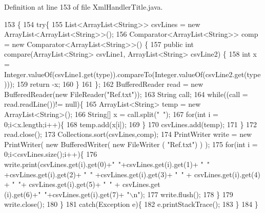 Definition at line 153 of file Xml\-Handler\-Title.\-java.


\begin{DoxyCode}
153                       \{
154         \textcolor{keywordflow}{try}\{
155             List<ArrayList<String>> csvLines = \textcolor{keyword}{new} ArrayList<ArrayList<String>>();
156             Comparator<ArrayList<String>> comp = \textcolor{keyword}{new} Comparator<ArrayList<String>>() \{
157                 \textcolor{keyword}{public} \textcolor{keywordtype}{int} compare(ArrayList<String> csvLine1, ArrayList<String> csvLine2) \{
158                     \textcolor{keywordtype}{int} x = Integer.valueOf(csvLine1.get(type)).compareTo(Integer.valueOf(csvLine2.get(type
      )));
159                     \textcolor{keywordflow}{return} -x;
160                 \}
161             \};
162             BufferedReader read = \textcolor{keyword}{new} BufferedReader(\textcolor{keyword}{new} FileReader(\textcolor{stringliteral}{"Ref.txt"}));
163             String call;
164             \textcolor{keywordflow}{while}((call = read.readLine())!= null)\{
165             ArrayList<String> temp = \textcolor{keyword}{new} ArrayList<String>();
166             String[] x = call.split(\textcolor{stringliteral}{"~"});
167             \textcolor{keywordflow}{for}(\textcolor{keywordtype}{int} i = 0;i<x.length;i++)\{
168                 temp.add(x[i]);
169             \}
170             csvLines.add(temp);
171             \}
172             read.close();
173             Collections.sort(csvLines,comp);
174             PrintWriter write = \textcolor{keyword}{new} PrintWriter( \textcolor{keyword}{new} BufferedWriter( \textcolor{keyword}{new} FileWriter ( \textcolor{stringliteral}{"Ref.txt"}) ) );
175             \textcolor{keywordflow}{for}(\textcolor{keywordtype}{int} i = 0;i<csvLines.size();i++)\{
176                 write.print(csvLines.get(i).\textcolor{keyword}{get}(0)+\textcolor{stringliteral}{"~"}+csvLines.get(i).\textcolor{keyword}{get}(1)+ \textcolor{stringliteral}{"~"} +csvLines.get(i).\textcolor{keyword}{get}(2)+
       \textcolor{stringliteral}{"~"} +csvLines.get(i).\textcolor{keyword}{get}(3)+ \textcolor{stringliteral}{"~"} + csvLines.get(i).\textcolor{keyword}{get}(4) + \textcolor{stringliteral}{"~"}+ csvLines.get(i).\textcolor{keyword}{get}(5)+ \textcolor{stringliteral}{"~"} + csvLines.get
      (i).\textcolor{keyword}{get}(6)+\textcolor{stringliteral}{"~"}+csvLines.get(i).\textcolor{keyword}{get}(7)+ \textcolor{stringliteral}{"\(\backslash\)n"});
177                 write.flush();
178             \}
179             write.close();
180             \}   
181             \textcolor{keywordflow}{catch}(Exception e)\{
182             e.printStackTrace();
183             \}
184         \}
\end{DoxyCode}


